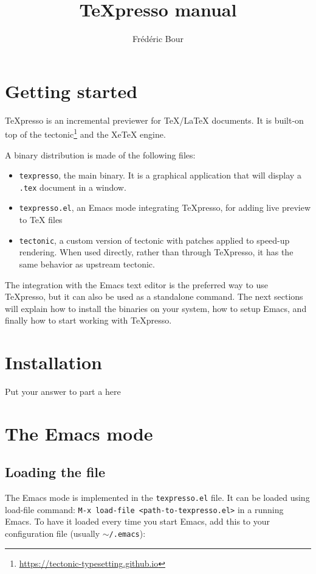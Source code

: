 \documentclass{article}
\title{TeXpresso manual}
\author{Frédéric Bour}
\begin{document}
\maketitle

\newcommand{\txp}{\TeX{}presso\xspace}
\newcommand{\furl}[1]{\footnote{\url{#1}}}

\section{Getting started}

\txp is an incremental previewer for \TeX/\LaTeX{} documents. It is built-on top of the tectonic\furl{https://tectonic-typesetting.github.io} and the XeTeX engine.

A binary distribution is made of the following files:

\begin{itemize}
  \item {\tt texpresso}, the main binary. It is a graphical application that will display a {\tt .tex} document in a window.
  \item {\tt texpresso.el}, an Emacs mode integrating \txp, for adding live preview to \TeX{} files
  \item {\tt tectonic}, a custom version of tectonic with patches applied to speed-up rendering. When used directly, rather than through \txp, it has the same behavior as upstream tectonic.
\end{itemize}

The integration with the Emacs text editor is the preferred way to use \txp, but it can also be used as a standalone command. The next sections will explain how to install the binaries on your system, how to setup Emacs, and finally how to start working with \txp.

\section{Installation}

Put your answer to part a here

\section{The Emacs mode}

\subsection{Loading the file}
The Emacs mode is implemented in the \texttt{texpresso.el} file. It can be loaded using load-file command: \texttt{M-x load-file <path-to-texpresso.el>} in a running Emacs. To have it loaded every time you start Emacs, add this to your configuration file (usually \texttt{$\sim$/.emacs}):
\end{document}
